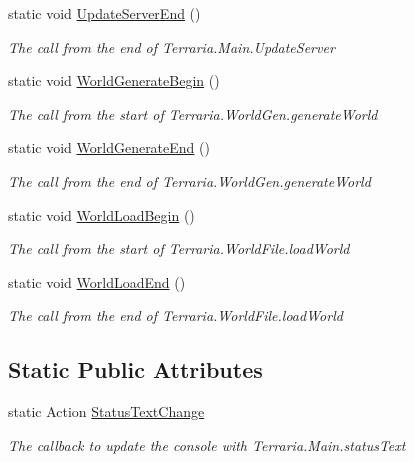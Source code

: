 \begin{DoxyCompactItemize}
static void \hyperlink{classOTA_1_1Callbacks_1_1MainCallback_a489a876181d41083bf400f5921fed1f7}{Update\+Server\+End} ()
\begin{DoxyCompactList}\small\item\em The call from the end of Terraria.\+Main.\+Update\+Server \end{DoxyCompactList}\item 
static void \hyperlink{classOTA_1_1Callbacks_1_1MainCallback_a84b46c587a13e79241a8fb22ccec7a7e}{World\+Generate\+Begin} ()
\begin{DoxyCompactList}\small\item\em The call from the start of Terraria.\+World\+Gen.\+generate\+World \end{DoxyCompactList}\item 
static void \hyperlink{classOTA_1_1Callbacks_1_1MainCallback_a0c1a35d8f54e7ecaa873fc298db4ffd8}{World\+Generate\+End} ()
\begin{DoxyCompactList}\small\item\em The call from the end of Terraria.\+World\+Gen.\+generate\+World \end{DoxyCompactList}\item 
static void \hyperlink{classOTA_1_1Callbacks_1_1MainCallback_a36c2fa93fcb892f8e28253f023c22bc1}{World\+Load\+Begin} ()
\begin{DoxyCompactList}\small\item\em The call from the start of Terraria.\+World\+File.\+load\+World \end{DoxyCompactList}\item 
static void \hyperlink{classOTA_1_1Callbacks_1_1MainCallback_a6bcd77c3f8ea68bc3339834a41b94604}{World\+Load\+End} ()
\begin{DoxyCompactList}\small\item\em The call from the end of Terraria.\+World\+File.\+load\+World \end{DoxyCompactList}\end{DoxyCompactItemize}
\subsection*{Static Public Attributes}
\begin{DoxyCompactItemize}
\item 
static Action \hyperlink{classOTA_1_1Callbacks_1_1MainCallback_a79fc2cb20f6182173dd53724237d882d}{Status\+Text\+Change}
\begin{DoxyCompactList}\small\item\em The callback to update the console with Terraria.\+Main.\+status\+Text \end{DoxyCompactList}\end{DoxyCompactItemize}
